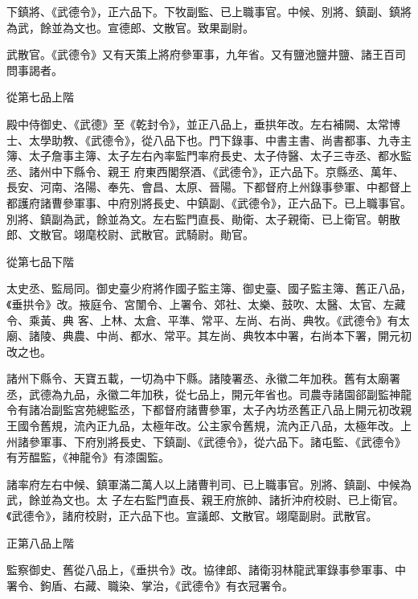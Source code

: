 \begin{pinyinscope}
 下鎮將、《武德令》，正六品下。下牧副監、已上職事官。中候、別將、鎮副、鎮將為武，餘並為文也。宣德郎、文散官。致果副尉。



 武散官。《武德令》又有天策上將府參軍事，九年省。又有鹽池鹽井鹽、諸王百司問事謁者。



 從第七品上階



 殿中侍御史、《武德》至《乾封令》，並正八品上，垂拱年改。左右補闕、太常博士、太學助教、《武德令》，從八品下也。門下錄事、中書主書、尚書都事、九寺主簿、太子詹事主簿、太子左右內率監門率府長史、太子侍醫、太子三寺丞、都水監丞、諸州中下縣令、親王
 府東西閣祭酒、《武德令》，正六品下。京縣丞、萬年、長安、河南、洛陽、奉先、會昌、太原、晉陽。下都督府上州錄事參軍、中都督上都護府諸曹參軍事、中府別將長史、中鎮副、《武德令》，正六品下。已上職事官。別將、鎮副為武，餘並為文。左右監門直長、勛衛、太子親衛、已上衛官。朝散郎、文散官。翊麾校尉、武散官。武騎尉。勛官。



 從第七品下階



 太史丞、監局同。御史臺少府將作國子監主簿、御史臺、國子監主簿、舊正八品，《垂拱令》改。掖庭令、宮闈令、上署令、郊社、太樂、鼓吹、太醫、太官、左藏令、乘黃、典
 客、上林、太倉、平準、常平、左尚、右尚、典牧。《武德令》有太廟、諸陵、典農、中尚、都水、常平。其左尚、典牧本中署，右尚本下署，開元初改之也。



 諸州下縣令、天寶五載，一切為中下縣。諸陵署丞、永徽二年加秩。舊有太廟署丞，武德為九品，永徽二年加秩，從七品上，開元年省也。司農寺諸園郤副監神龍令有諸冶副監宮苑總監丞，下都督府諸曹參軍，太子內坊丞舊正八品上開元初改親王國令舊規，流內正九品，太極年改。公主家令舊規，流內正八品，太極年改。上州諸參軍事、下府別將長史、下鎮副、《武德令》，從六品下。諸屯監、《武德令》有芳醖監，《神龍令》有漆園監。



 諸率府左右中候、鎮軍滿二萬人以上諸曹判司、已上職事官。別將、鎮副、中候為武，餘並為文也。太
 子左右監門直長、親王府旅帥、諸折沖府校尉、已上衛官。《武德令》，諸府校尉，正六品下也。宣議郎、文散官。翊麾副尉。武散官。



 正第八品上階



 監察御史、舊從八品上，《垂拱令》改。協律郎、諸衛羽林龍武軍錄事參軍事、中署令、鉤盾、右藏、職染、掌治，《武德令》有衣冠署令。




\end{pinyinscope}
